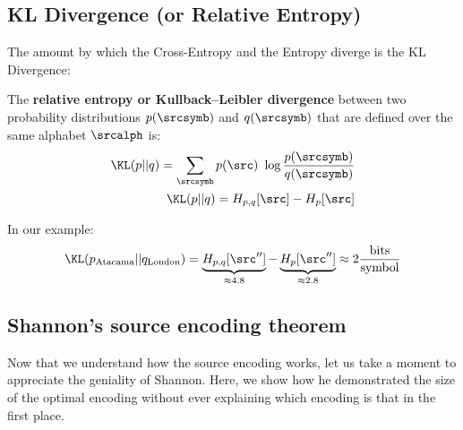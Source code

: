 \subsection{KL Divergence (or Relative Entropy)} The amount by which the Cross-Entropy and the Entropy diverge is the KL Divergence:
\begin{definition}
	The \textbf{relative entropy or Kullback–Leibler divergence} between two probability distributions \(p(\srcsymb)\) and \(q(\srcsymb)\) that are defined over the same alphabet \(\srcalph \) is:
	\begin{align}
		\KL(p||q) = \sum_{\srcsymb} p(\src)~\log \frac{p(\srcsymb)}{q(\srcsymb)}\\
		\KL(p||q) = H_{p,q}[\src] - H_p[\src] \label{eq:KL_decomposition}
	\end{align}
\end{definition}
In our example:
\begin{align}
	\KL(p_{\text{Atacama}}||q_{\text{London}}) = \underbrace{H_{p,q}[\src'']}_{\approx 4.8} - \underbrace{H_p[\src'']}_{\approx 2.8} \approx 2 \frac{\text{bits}}{\text{symbol}}
\end{align}

\subsection{Shannon's source encoding theorem}\label{sec:source_encoding_theorem}
Now that we understand how the source encoding works, let us take a moment to appreciate the geniality of Shannon.  Here, we show how he demonstrated the size of the optimal encoding without ever explaining which encoding is that in the first place.

